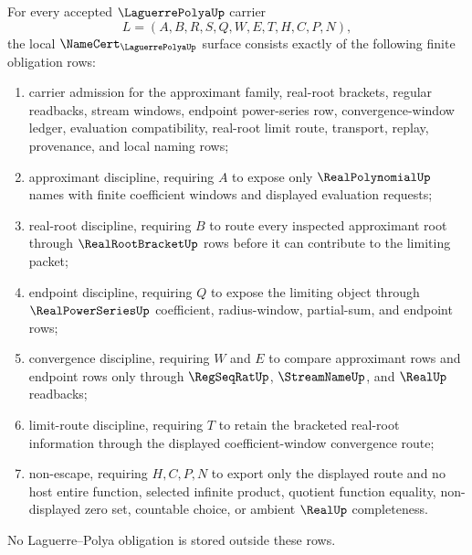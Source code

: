 \begin{theorem}
\label{thm:laguerre-polya-namecert-obligations}
For every accepted $\LaguerrePolyaUp$ carrier
$$
L=(A,B,R,S,Q,W,E,T,H,C,P,N),
$$
the local $\NameCert_{\LaguerrePolyaUp}$ surface consists exactly of the following finite obligation rows:
\begin{enumerate}
\item carrier admission for the approximant family, real-root brackets, regular readbacks, stream windows, endpoint power-series row, convergence-window ledger, evaluation compatibility, real-root limit route, transport, replay, provenance, and local naming rows;
\item approximant discipline, requiring $A$ to expose only $\RealPolynomialUp$ names with finite coefficient windows and displayed evaluation requests;
\item real-root discipline, requiring $B$ to route every inspected approximant root through $\RealRootBracketUp$ rows before it can contribute to the limiting packet;
\item endpoint discipline, requiring $Q$ to expose the limiting object through $\RealPowerSeriesUp$ coefficient, radius-window, partial-sum, and endpoint rows;
\item convergence discipline, requiring $W$ and $E$ to compare approximant rows and endpoint rows only through $\RegSeqRatUp$, $\StreamNameUp$, and $\RealUp$ readbacks;
\item limit-route discipline, requiring $T$ to retain the bracketed real-root information through the displayed coefficient-window convergence route;
\item non-escape, requiring $H,C,P,N$ to export only the displayed route and no host entire function, selected infinite product, quotient function equality, non-displayed zero set, countable choice, or ambient $\RealUp$ completeness.
\end{enumerate}
No Laguerre--Polya obligation is stored outside these rows.
\end{theorem}
